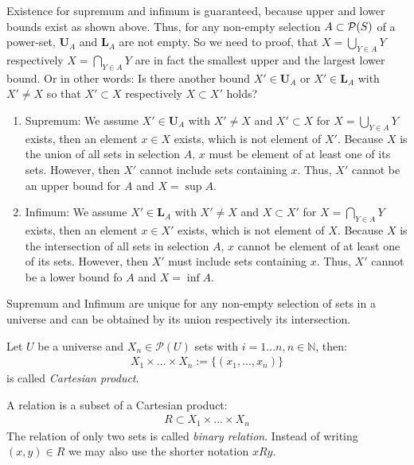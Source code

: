 Existence for supremum and infimum is guaranteed, because upper and lower bounds exist as shown above.
Thus, for any non-empty selection $A \subset \mathcal{P}(S)$ of a power-set, $\mathbf{U}_A$ and $\mathbf{L}_A$ are not empty.
So we need to proof, that $X = \bigcup\limits_{Y \in A} Y$ respectively $X = \bigcap\limits_{Y \in A} Y$ are in fact the smallest upper and the  largest lower bound.
Or in other words: Is there another bound $X' \in \mathbf{U}_A$ or $X' \in \mathbf{L}_A$ with $X' \neq X$ so that $X' \subset X$ respectively $X \subset X'$ holds?
\begin{enumerate}
\item
Supremum:
We assume $X' \in \mathbf{U}_A$ with $X' \neq X$ and $X' \subset X$ for $X = \bigcup\limits_{Y \in A} Y$ exists, then an element $x \in X$ exists, which is not element of $X'$.
Because $X$ is the union of all sets in selection $A$, $x$ must be element of at least one of its sets.
However, then $X'$ cannot include sets containing $x$.
Thus, $X'$ cannot be an upper bound for $A$ and $X = \sup A$.

\item
Infimum:
We assume $X' \in \mathbf{L}_A$ with $X' \neq X$ and $X \subset X'$ for $X = \bigcap\limits_{Y \in A} Y$ exists, then an element $x \in X'$ exists, which is not element of $X$.
Because $X$ is the intersection of all sets in selection $A$, $x$ cannot be element of at least one of its sets.
However, then $X'$ must include sets containing $x$.
Thus, $X'$ cannot be a lower bound fo $A$ and $X = \inf A$.

\end{enumerate}
Supremum and Infimum are unique for any non-empty selection of sets in a universe and can be obtained by its union respectively its intersection.



\begin{definition}
Let $U$ be a universe and $X_n \in \mathcal{P}(U)$ sets with $ i=1...n, n \in \mathbb{N}$, then:
\begin{align}
X_1 \times ... \times X_n := \{ (x_1,..., x_n) \}
\end{align} 
is called \emph{Cartesian product}.
\end{definition}

\begin{definition}[Relation]
A relation is a subset of a Cartesian product:
\begin{align}
R \subset X_1 \times ... \times X_n 
\end{align}
The relation of only two sets is called \emph{binary relation}.
Instead of writing $(x,y) \in R$ we may also use the shorter notation $xRy$.
\end{definition}

